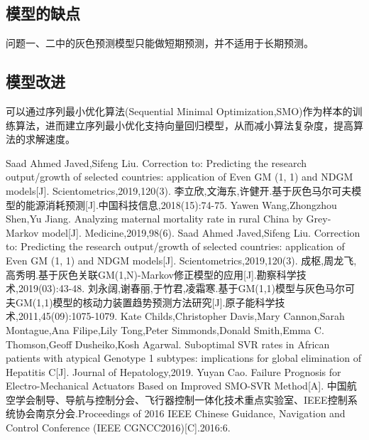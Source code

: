 \documentclass{whutmod}
\begin{document}
  \subsection{模型的缺点}
  
  问题一、二中的灰色预测模型只能做短期预测，并不适用于长期预测。
  \subsection{模型改进}
  
  可以通过序列最小优化算法(Sequential Minimal Optimization,SMO)作为样本的训练算法，进而建立序列最小优化支持向量回归模型，从而减小算法复杂度，提高算法的求解速度。
  
  
  
 
	\newpage	%
	\nocite{*}		%
%
%	
\begin{thebibliography}{9}%
	Saad Ahmed Javed,Sifeng Liu. Correction to: Predicting the research output/growth of selected countries: application of Even GM (1, 1) and NDGM models[J]. Scientometrics,2019,120(3).
	李立欣,文海东,许健开.基于灰色马尔可夫模型的能源消耗预测[J].中国科技信息,2018(15):74-75.	
	Yawen Wang,Zhongzhou Shen,Yu Jiang. Analyzing maternal mortality rate in rural China by Grey-Markov model[J]. Medicine,2019,98(6).
	Saad Ahmed Javed,Sifeng Liu. Correction to: Predicting the research output/growth of selected countries: application of Even GM (1, 1) and NDGM models[J]. Scientometrics,2019,120(3).
	成枢,周龙飞,高秀明.基于灰色关联GM(1,N)-Markov修正模型的应用[J].勘察科学技术,2019(03):43-48.
	刘永阔,谢春丽,于竹君,凌霜寒.基于GM(1,1)模型与灰色马尔可夫GM(1,1)模型的核动力装置趋势预测方法研究[J].原子能科学技术,2011,45(09):1075-1079.
	Kate Childs,Christopher Davis,Mary Cannon,Sarah Montague,Ana Filipe,Lily Tong,Peter Simmonds,Donald Smith,Emma C. Thomson,Geoff Dusheiko,Kosh Agarwal. Suboptimal SVR rates in African patients with atypical Genotype 1 subtypes: implications for global elimination of Hepatitis C[J]. Journal of Hepatology,2019.
	Yuyan Cao. Failure Prognosis for Electro-Mechanical Actuators Based on Improved SMO-SVR Method[A]. 中国航空学会制导、导航与控制分会、飞行器控制一体化技术重点实验室、IEEE控制系统协会南京分会.Proceedings of 2016 IEEE Chinese Guidance, Navigation and Control Conference (IEEE CGNCC2016)[C].2016:6.
\end{thebibliography}
\end{document}
